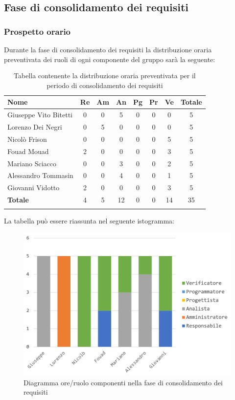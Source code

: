 		
		
	\subsection{Fase di consolidamento dei requisiti}
			\subsubsection{Prospetto orario}
			Durante la fase di consolidamento dei requisiti la distribuzione oraria preventivata dei ruoli di ogni componente del gruppo sarà la seguente:
			
			\begin{longtable}{|l|c|c|c|c|c|c|c|}
				\hline
				\rowcolor{lighter-grayer}
				\textbf{Nome} & \textbf{Re} & \textbf{Am} & \textbf{An} & \textbf{Pg}  & \textbf{Pr}   & \textbf{Ve} & \textbf{Totale} \\
				\hline
				\endfirsthead
				
				\hline
				Giuseppe Vito Bitetti & 0 & 0 & 5 & 0 & 0 & 0 & 5\\
				\hline
				\hline
				Lorenzo Dei Negri & 0 & 5 & 0 & 0 & 0 & 0 & 5\\
				\hline
				\hline
				Nicolò Frison & 0 & 0 & 0 & 0 & 0 & 5 & 5\\
				\hline
				\hline
				Fouad Mouad & 2 & 0 & 0 & 0 & 0 & 3 & 5\\
				\hline
				\hline
				Mariano Sciacco & 0 & 0 & 3 & 0 & 0 & 2 & 5\\
				\hline
				\hline
				Alessandro Tommasin & 0 & 0 & 4 & 0 & 0 & 1 & 5\\
				\hline
				\hline
				Giovanni Vidotto & 2 & 0 & 0 & 0 & 0 & 3 & 5\\
				\hline 
				\textbf{Totale} & 4 &  5 & 12 & 0 & 0 & 14 & 35\\
				\hline
				\caption{Tabella contenente la distribuzione oraria preventivata per il periodo di consolidamento dei requisiti}
			\end{longtable}
			\pagebreak
		
			La tabella può essere riassunta nel seguente istogramma:
			\begin{figure}[H]
				\centering
				\includegraphics[width=0.8\linewidth]{./images/preventivo/consRequisiti1.png}
				\caption{Diagramma ore/ruolo componenti nella fase di consolidamento dei requisiti}
				\label{fig:diagramma suddivione ruoli fase consolidamento requisiti}
			\end{figure}
		

